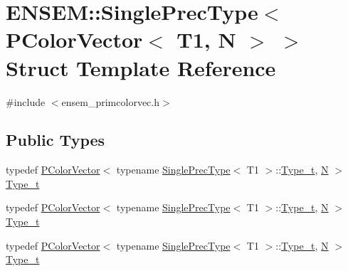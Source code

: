 \hypertarget{structENSEM_1_1SinglePrecType_3_01PColorVector_3_01T1_00_01N_01_4_01_4}{}\section{E\+N\+S\+EM\+:\+:Single\+Prec\+Type$<$ P\+Color\+Vector$<$ T1, N $>$ $>$ Struct Template Reference}
\label{structENSEM_1_1SinglePrecType_3_01PColorVector_3_01T1_00_01N_01_4_01_4}


{\ttfamily \#include $<$ensem\+\_\+primcolorvec.\+h$>$}

\subsection*{Public Types}
\begin{DoxyCompactItemize}
\item 
typedef \mbox{\hyperlink{classENSEM_1_1PColorVector}{P\+Color\+Vector}}$<$ typename \mbox{\hyperlink{structENSEM_1_1SinglePrecType}{Single\+Prec\+Type}}$<$ T1 $>$\+::\mbox{\hyperlink{structENSEM_1_1SinglePrecType_3_01PColorVector_3_01T1_00_01N_01_4_01_4_adbaedd406be0507c332f7676ad81053d}{Type\+\_\+t}}, \mbox{\hyperlink{adat__devel_2lib_2hadron_2operator__name__util_8cc_a7722c8ecbb62d99aee7ce68b1752f337}{N}} $>$ \mbox{\hyperlink{structENSEM_1_1SinglePrecType_3_01PColorVector_3_01T1_00_01N_01_4_01_4_adbaedd406be0507c332f7676ad81053d}{Type\+\_\+t}}
\item 
typedef \mbox{\hyperlink{classENSEM_1_1PColorVector}{P\+Color\+Vector}}$<$ typename \mbox{\hyperlink{structENSEM_1_1SinglePrecType}{Single\+Prec\+Type}}$<$ T1 $>$\+::\mbox{\hyperlink{structENSEM_1_1SinglePrecType_3_01PColorVector_3_01T1_00_01N_01_4_01_4_adbaedd406be0507c332f7676ad81053d}{Type\+\_\+t}}, \mbox{\hyperlink{adat__devel_2lib_2hadron_2operator__name__util_8cc_a7722c8ecbb62d99aee7ce68b1752f337}{N}} $>$ \mbox{\hyperlink{structENSEM_1_1SinglePrecType_3_01PColorVector_3_01T1_00_01N_01_4_01_4_adbaedd406be0507c332f7676ad81053d}{Type\+\_\+t}}
\item 
typedef \mbox{\hyperlink{classENSEM_1_1PColorVector}{P\+Color\+Vector}}$<$ typename \mbox{\hyperlink{structENSEM_1_1SinglePrecType}{Single\+Prec\+Type}}$<$ T1 $>$\+::\mbox{\hyperlink{structENSEM_1_1SinglePrecType_3_01PColorVector_3_01T1_00_01N_01_4_01_4_adbaedd406be0507c332f7676ad81053d}{Type\+\_\+t}}, \mbox{\hyperlink{adat__devel_2lib_2hadron_2operator__name__util_8cc_a7722c8ecbb62d99aee7ce68b1752f337}{N}} $>$ \mbox{\hyperlink{structENSEM_1_1SinglePrecType_3_01PColorVector_3_01T1_00_01N_01_4_01_4_adbaedd406be0507c332f7676ad81053d}{Type\+\_\+t}}
\end{DoxyCompactItemize}


